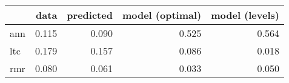 \begin{tabular}{lrrrr}
\toprule
{} &   data &  predicted &  model (optimal) &  model (levels) \\
\midrule
ann &  0.115 &      0.090 &            0.525 &           0.564 \\
ltc &  0.179 &      0.157 &            0.086 &           0.018 \\
rmr &  0.080 &      0.061 &            0.033 &           0.050 \\
\bottomrule
\end{tabular}

